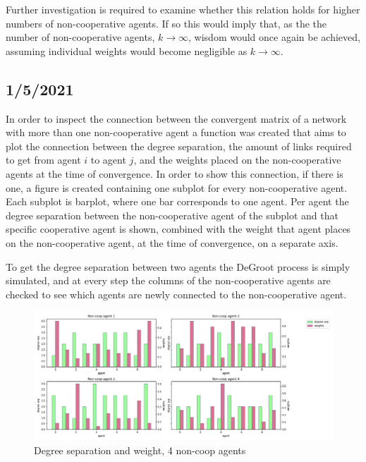 \documentclass{article}
\begin{document}
Further investigation is required to examine whether this relation holds for higher numbers of non-cooperative agents. If so this would imply that, as the the number of non-cooperative agents, $k \to \infty$, wisdom would once again be achieved, assuming individual weights would become negligible as $k \to \infty$.

\newpage

\subsection{1/5/2021}

In order to inspect the connection between the convergent matrix of a network with more than one non-cooperative agent a function was created that aims to plot the connection between the degree separation, the amount of links required to get from agent $i$ to agent $j$, and the weights placed on the non-cooperative agents at the time of convergence.
In order to show this connection, if there is one, a figure is created containing one subplot for every non-cooperative agent. Each subplot is barplot, where one bar corresponds to one agent. Per agent the degree separation between the non-cooperative agent of the subplot and that specific cooperative agent is shown, combined with the weight that agent places on the non-cooperative agent, at the time of convergence, on a separate axis.

To get the degree separation between two agents the DeGroot process is simply simulated, and at every step the columns of the non-cooperative agents are checked to see which agents are newly connected to the non-cooperative agent.

\begin{center}
    \begin{figure}[!htbp]
        \centering
        \includegraphics[width=\textwidth]{ThesisKI/Images/SepWeight4.png}
        \caption{Degree separation and weight, 4 non-coop agents}
        \label{degree_sep_weight:4}
    \end{figure}
\end{center}
\end{document}
